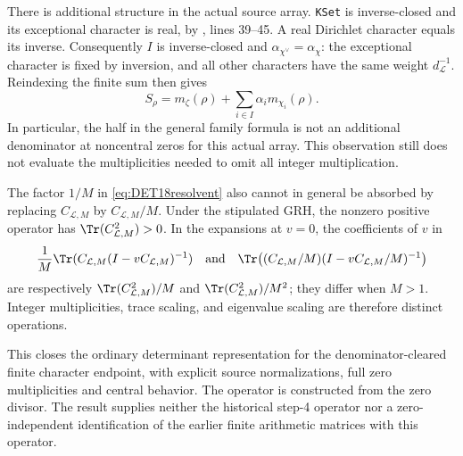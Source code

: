 There is additional structure in the actual source array.
\texttt{KSet} is inverse-closed and its exceptional character is
real, by , lines 39--45.
A real Dirichlet character equals its inverse. Consequently
$I$ is inverse-closed and $\alpha_{\chi^\vee}=\alpha_\chi$:
the exceptional character is fixed by inversion, and all other
characters have the same weight $d_{\mathcal L}^{-1}$.
Reindexing the finite sum then gives
\[
 S_\rho=m_\zeta(\rho)+\sum_{i\in I}\alpha_i m_{\chi_i}(\rho).
\]
In particular, the half in the general family formula is not an
additional denominator at noncentral zeros for this actual array.
This observation still does not evaluate the multiplicities needed
to omit all integer multiplication.

The factor $1/M$ in \eqref{eq:DET18resolvent} also cannot in general
be absorbed by replacing $C_{\mathcal L,M}$ by
$C_{\mathcal L,M}/M$. Under the stipulated GRH, the nonzero positive
operator has $\Tr(C_{\mathcal L,M}^2)>0$. In the expansions at $v=0$,
the coefficients of $v$ in
\[
 \frac1M\Tr(C_{\mathcal L,M}(I-vC_{\mathcal L,M})^{-1})
 \quad\hbox{and}\quad
 \Tr\bigl((C_{\mathcal L,M}/M)
 (I-vC_{\mathcal L,M}/M)^{-1}\bigr)
\]
are respectively $\Tr(C_{\mathcal L,M}^2)/M$ and
$\Tr(C_{\mathcal L,M}^2)/M^2$; they differ when $M>1$.
Integer multiplicities, trace scaling, and eigenvalue scaling are
therefore distinct operations.

This closes the ordinary determinant representation for the
denominator-cleared finite character endpoint, with explicit source
normalizations, full zero multiplicities and central behavior.
The operator is constructed from the zero divisor. The result
supplies neither the historical step-4 operator nor a zero-independent
identification of the earlier finite arithmetic matrices with this
operator.

